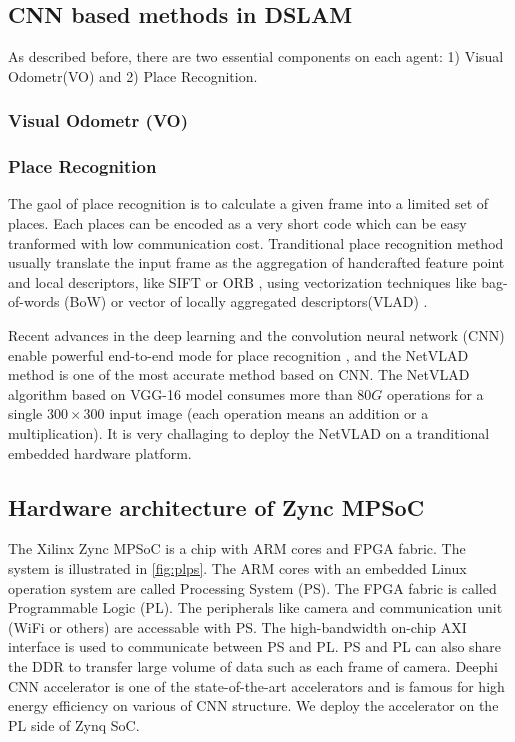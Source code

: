 \label{sec:background}
\subsection{CNN based methods in DSLAM}
As described before, there are two essential components on each agent: 1) Visual Odometr(VO) and 2) Place Recognition.

\subsubsection{Visual Odometr (VO)}

\subsubsection{Place Recognition}

The gaol of place recognition is to calculate a given frame into a limited set of places. Each  places can be encoded as a very short code which can be easy tranformed with low communication cost. Tranditional place recognition method usually translate the input frame as the aggregation of handcrafted feature point and local descriptors, like SIFT \cite{Lowe:2004e6e} or ORB \cite{Mur-Artal:2017281}, using vectorization techniques like bag-of-words (BoW) \cite{Galvez-Lopez:2012c94} or vector of locally aggregated descriptors(VLAD) \cite{Jegou:2010f45}.

Recent advances in the deep learning and the convolution neural network (CNN) enable powerful end-to-end mode for place recognition \cite{Noh:2017d0b,Arandjelovic:2017997}, and the NetVLAD method is one of the most accurate method based on CNN. The NetVLAD algorithm based on VGG-16 model \cite{Simonyan:20143be} consumes more than $80G$ operations for a single $300 \times 300$ input image (each operation means an addition or a multiplication). It is very challaging to deploy the NetVLAD on a tranditional embedded hardware platform.

\subsection{Hardware architecture of Zync MPSoC}
The Xilinx Zync MPSoC is a chip with ARM cores and FPGA fabric. The system is illustrated in \cref{fig:plps}. The ARM cores with an embedded Linux operation system are called Processing System (PS). The FPGA fabric is called Programmable Logic (PL). The peripherals like camera and communication unit (WiFi or others) are accessable with PS. The high-bandwidth on-chip AXI interface is used to communicate between PS and PL. PS and PL can also share the DDR to transfer large volume of data such as each frame of camera.
Deephi CNN accelerator \cite{Tech:2019360} is one of the state-of-the-art accelerators and is famous for high energy efficiency on various of CNN structure. We deploy the accelerator on the PL side of Zynq SoC.

